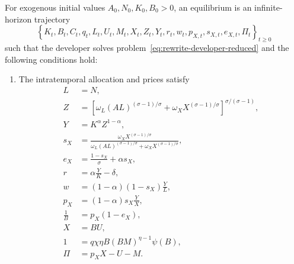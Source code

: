 \begin{definition}[Equilibrium]
\label{def:rewrite-equilibrium}
For exogenous initial values $A_0,N_0,K_0,B_0>0$, an equilibrium is an
infinite-horizon trajectory
\[
 \left\{K_t,B_t,C_t,q_t,L_t,U_t,M_t,X_t,Z_t,Y_t,r_t,w_t,p_{X,t},
 s_{X,t},e_{X,t},\Pi_t\right\}_{t\geq0}
\]
such that the developer solves problem~\eqref{eq:rewrite-developer-reduced}
and the following conditions hold:

\begin{enumerate}
\item The intratemporal allocation and prices satisfy
\begin{subequations}
\label{eq:rewrite-equilibrium-static}
\begin{align}
 L&=N,
 \label{eq:rewrite-eq-labor}\\
 Z&=\left[\omega_L(AL)^{(\sigma-1)/\sigma}
 +\omega_XX^{(\sigma-1)/\sigma}\right]^{
 \sigma/(\sigma-1)},
 \label{eq:rewrite-eq-z}\\
 Y&=K^\alpha Z^{1-\alpha},
 \label{eq:rewrite-eq-y}\\
 s_X&=\frac{\omega_XX^{(\sigma-1)/\sigma}}
 {\omega_L(AL)^{(\sigma-1)/\sigma}
 +\omega_XX^{(\sigma-1)/\sigma}},
 \label{eq:rewrite-eq-sx}\\
 e_X&=\frac{1-s_X}{\sigma}+\alpha s_X,
 \label{eq:rewrite-eq-ex}\\
 r&=\alpha\frac{Y}{K}-\delta,
 \label{eq:rewrite-eq-r}\\
 w&=(1-\alpha)(1-s_X)\frac{Y}{L},
 \label{eq:rewrite-eq-w}\\
 p_X&=(1-\alpha)s_X\frac{Y}{X},
 \label{eq:rewrite-eq-px}\\
 \frac{1}{B}&=p_X(1-e_X),
 \label{eq:rewrite-eq-monopoly}\\
 X&=BU,
 \label{eq:rewrite-eq-service}\\
 1&=q\chi\eta B(BM)^{\eta-1}\psi(B),
 \label{eq:rewrite-eq-research}\\
 \Pi&=p_XX-U-M.
 \label{eq:rewrite-eq-profit}
\end{align}
\end{subequations}

\end{enumerate}
\end{definition}
